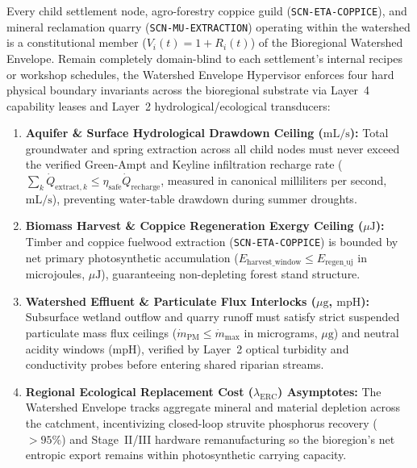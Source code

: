 Every child settlement node, agro-forestry coppice guild (\texttt{SCN-ETA-COPPICE}), and mineral reclamation quarry (\texttt{SCN-MU-EXTRACTION}) operating within the watershed is a constitutional member ($V_i(t) = 1 + R_i(t)$) of the Bioregional Watershed Envelope. Remain completely domain-blind to each settlement's internal recipes or workshop schedules, the Watershed Envelope Hypervisor enforces four hard physical boundary invariants across the bioregional substrate via Layer~4 capability leases and Layer~2 hydrological/ecological transducers:
\begin{enumerate}
    \item \textbf{Aquifer \& Surface Hydrological Drawdown Ceiling ($\mathrm{mL/s}$):} Total groundwater and spring extraction across all child nodes must never exceed the verified Green-Ampt and Keyline infiltration recharge rate ($\sum_k \dot{Q}_{\mathrm{extract},k} \le \eta_{\mathrm{safe}} \dot{Q}_{\mathrm{recharge}}$, measured in canonical milliliters per second, $\mathrm{mL/s}$), preventing water-table drawdown during summer droughts.
    \item \textbf{Biomass Harvest \& Coppice Regeneration Exergy Ceiling ($\mu\mathrm{J}$):} Timber and coppice fuelwood extraction (\texttt{SCN-ETA-COPPICE}) is bounded by net primary photosynthetic accumulation ($E_{\mathrm{harvest\_window}} \le E_{\mathrm{regen\_uj}}$ in microjoules, $\mu\mathrm{J}$), guaranteeing non-depleting forest stand structure.
    \item \textbf{Watershed Effluent \& Particulate Flux Interlocks ($\mu\mathrm{g}$, $\mathrm{mpH}$):} Subsurface wetland outflow and quarry runoff must satisfy strict suspended particulate mass flux ceilings ($\dot{m}_{\mathrm{PM}} \le \dot{m}_{\max}$ in micrograms, $\mu\mathrm{g}$) and neutral acidity windows ($\mathrm{mpH}$), verified by Layer~2 optical turbidity and conductivity probes before entering shared riparian streams.
    \item \textbf{Regional Ecological Replacement Cost ($\lambda_{\mathrm{ERC}}$) Asymptotes:} The Watershed Envelope tracks aggregate mineral and material depletion across the catchment, incentivizing closed-loop struvite phosphorus recovery ($>95\%$) and Stage~II/III hardware remanufacturing so the bioregion's net entropic export remains within photosynthetic carrying capacity.
\end{enumerate}

